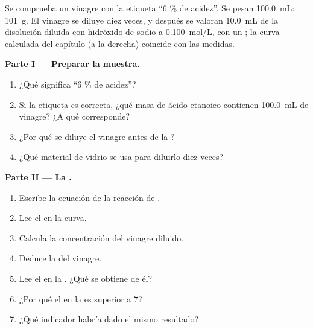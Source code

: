 \begin{problem}
\label{pb:g12:ph-conductivity-titrations:1}
Se comprueba un vinagre con la etiqueta ``6 \% de acidez''. Se pesan
\qty{100.0}{mL}: \qty{101}{g}. El vinagre se diluye diez veces, y después
se valoran \qty{10.0}{mL} de la disolución diluida con hidróxido de
sodio a \qty{0.100}{mol/L}, con un ; la curva calculada del
capítulo (a la derecha) coincide con las medidas.

\medskip
\noindent\textbf{Parte I --- Preparar la muestra.}
\begin{enumerate}
  \item ¿Qué significa ``6 \% de acidez''?
  \item Si la etiqueta es correcta, ¿qué masa de ácido etanoico contienen
        \qty{100.0}{mL} de vinagre? ¿A qué 
        corresponde?
  \item ¿Por qué se diluye el vinagre antes de la ?
  \item ¿Qué material de vidrio se usa para diluirlo diez veces?
\end{enumerate}

\medskip
\noindent\textbf{Parte II --- La .}
\begin{enumerate}[resume]
  \item Escribe la ecuación de la reacción de .
  \item Lee el  en la curva.
  \item Calcula la concentración del vinagre diluido.
  \item Deduce la del vinagre.
  \item Lee el  en la . ¿Qué se obtiene de él?
  \item ¿Por qué el  en la  es superior a 7?
  \item ¿Qué indicador habría dado el mismo resultado?
\end{enumerate}


\end{problem}
